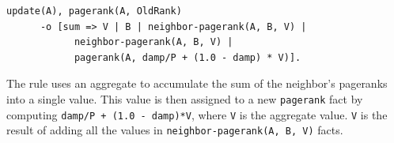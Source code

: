 \begin{Verbatim}[fontsize=\scriptsize]
update(A), pagerank(A, OldRank)
      -o [sum => V | B | neighbor-pagerank(A, B, V) |
            neighbor-pagerank(A, B, V) |
            pagerank(A, damp/P + (1.0 - damp) * V)].
\end{Verbatim}

The rule uses an aggregate to accumulate the sum of the
neighbor's pageranks into a single value. This value is then assigned to a new
\texttt{pagerank} fact by computing \texttt{damp/P + (1.0 - damp)*V}, where
\texttt{V} is the aggregate value. \texttt{V} is the result of adding all the
values in \texttt{neighbor-pagerank(A, B, V)} facts.




